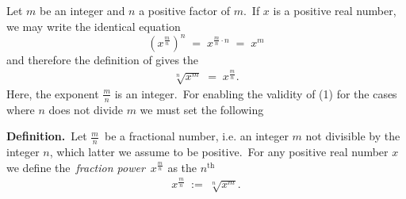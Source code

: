 \documentclass[12pt]{article}
\theoremstyle{definition}
\begin{document}
Let $m$ be an integer and $n$ a positive factor of $m$.\, If $x$ is a positive real number, we may write the identical equation
       $$(x^{\frac{m}{n}})^n \;=\; x^{\frac{m}{n}\cdot n} \;=\; x^m$$
and therefore the definition of  gives the 
\begin{align}
\sqrt[n]{x^m} \;=\;  x^{\frac{m}{n}}.
\end{align}
Here, the exponent $\frac{m}{n}$ is an integer.\, For enabling the validity of (1) for the cases where $n$ does not divide $m$ we must set the following

\textbf{Definition.}\, Let $\frac{m}{n}$\, be a fractional number, i.e. an integer $m$ not divisible by the integer $n$, which latter we assume to be positive.\, For any positive real number $x$ we define the\, {\em fraction power}\, $x^{\frac{m}{n}}$ as the $n^\mathrm{th}$ 
\begin{align}
             x^{\frac{m}{n}} \;:=\; \sqrt[n]{x^m}.
\end{align}
\end{document}
